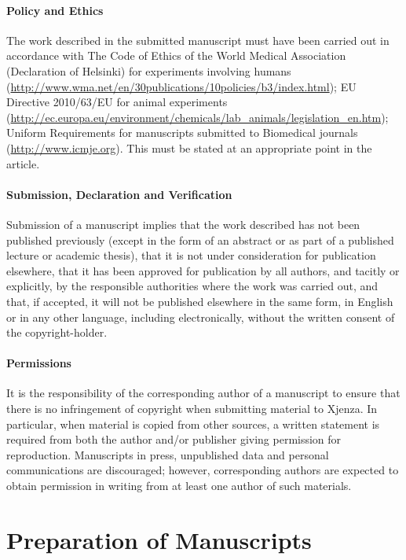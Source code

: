 \paragraph{Policy and Ethics}

The work described in the submitted manuscript must have been carried out in accordance with The Code of Ethics of the World Medical Association (Declaration of Helsinki) for experiments involving humans (\url{http://www.wma.net/en/30publications/10policies/b3/index.html}); EU Directive 2010/63/EU for animal experiments (\url{http://ec.europa.eu/environment/chemicals/lab\_animals/legislation\_en.htm}); Uniform Requirements for manuscripts submitted to Biomedical journals (\url{http://www.icmje.org}). This must be stated at an appropriate point in the article.

\paragraph{Submission, Declaration and Verification}

Submission of a manuscript implies that the work described has not been published previously (except in the form of an abstract or as part of a published lecture or academic thesis), that it is not under consideration for publication elsewhere, that it has been approved for publication by all authors, and tacitly or explicitly, by the responsible authorities where the work was carried out, and that, if accepted, it will not be published elsewhere in the same form, in English or in any other language, including electronically, without the written consent of the copyright-holder.

\paragraph{Permissions}

It is the responsibility of the corresponding author of a manuscript to ensure that there is no infringement of copyright when submitting material to Xjenza. In particular, when material is copied from other sources, a written statement is required from both the author and/or publisher giving permission for reproduction.
Manuscripts in press, unpublished data and personal communications are discouraged; however, corresponding authors are expected to obtain permission in writing from at least one author of such materials.

\section*{Preparation of Manuscripts}

